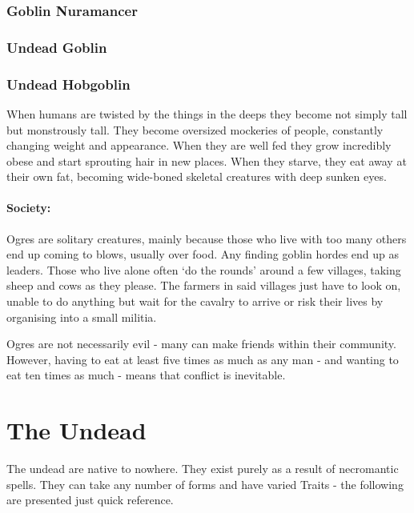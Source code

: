 \deepgoblin

\subsubsection{Goblin Nuramancer}
\goblinnuramancer

\subsubsection{Undead Goblin}

\undeadgoblin

\subsubsection{Undead Hobgoblin}

\undeadhobgoblin


\label{ogre}
\ogre


When humans are twisted by the things in the deeps they become not simply tall but monstrously tall.  They become oversized mockeries of people, constantly changing weight and appearance.  When they are well fed they grow incredibly obese and start sprouting hair in new places.  When they starve, they eat away at their own fat, becoming wide-boned skeletal creatures with deep sunken eyes.

\paragraph{Society:} Ogres are solitary creatures, mainly because those who live with too many others end up coming to blows, usually over food.  Any finding goblin hordes end up as leaders.  Those who live alone often `do the rounds' around a few villages, taking sheep and cows as they please.  The farmers in said villages just have to look on, unable to do anything but wait for the cavalry to arrive or risk their lives by organising into a small militia.

	Ogres are not necessarily evil - many can make friends within their community.  However, having to eat at least five times as much as any man - and wanting to eat ten times as much - means that conflict is inevitable.

\section{The Undead}

The undead are native to nowhere.  They exist purely as a result of necromantic spells.  They can take any number of forms and have varied Traits - the following are presented just quick reference.

